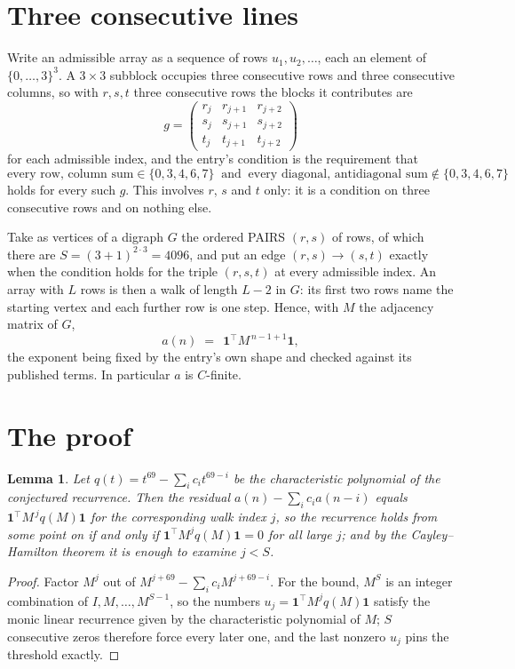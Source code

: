 \documentclass[11pt,a4paper]{article}
\theoremstyle{plain}
\newtheorem{lemma}[theorem]{Lemma}
\theoremstyle{definition}
\begin{document}
\section{Three consecutive lines}

Write an admissible array as a sequence of rows $u_1,u_2,\dots$, each an element of
$\{0,\dots,3\}^{3}$. A $3\times3$ subblock occupies three consecutive rows and
three consecutive columns, so with $r,s,t$ three consecutive rows the blocks it
contributes are
\[
g=\begin{pmatrix}r_j&r_{j+1}&r_{j+2}\\ s_j&s_{j+1}&s_{j+2}\\ t_j&t_{j+1}&t_{j+2}\end{pmatrix}
\]
for each admissible index, and the entry's condition is the requirement that
\[
\text{every row, column sum} \in \{0,3,4,6,7\}\ \text{ and }\ \text{every diagonal, antidiagonal sum} \notin \{0,3,4,6,7\}
\]
holds for every such $g$. This involves $r$, $s$ and $t$ only: it is a condition on
three consecutive rows and on nothing else.

Take as vertices of a digraph $G$ the ordered PAIRS $(r,s)$ of rows, of which there are
$S=(3+1)^{2\cdot3}=4096$, and put an edge $(r,s)\to(s,t)$ exactly when the condition
holds for the triple $(r,s,t)$ at every admissible index. An array with $L$ rows is then a
walk of length $L-2$ in $G$: its first two rows name the starting vertex and each further
row is one step. Hence, with $M$ the adjacency matrix of $G$,
\[
a(n)\;=\;\,\mathbf{1}^{\!\top}M^{\,n-1+1}\mathbf{1},
\]
the exponent being fixed by the entry's own shape and checked against its published terms.
In particular $a$ is $C$-finite.

\section{The proof}

\begin{lemma}\label{lem:crit}
Let $q(t)=t^{69}-\sum_i c_it^{69-i}$ be the characteristic polynomial of the
conjectured recurrence. Then the residual $a(n)-\sum_ic_ia(n-i)$ equals
$\mathbf{1}^{\!\top}M^{\,j}q(M)\mathbf{1}$ for the corresponding walk index
$j$, so the recurrence holds from some point on if and only if
$\mathbf{1}^{\!\top}M^{j}q(M)\mathbf{1}=0$ for all large $j$; and by the
Cayley--Hamilton theorem it is enough to examine $j<S$.
\end{lemma}

\begin{proof}
Factor $M^{j}$ out of $M^{j+69}-\sum_ic_iM^{j+69-i}$. For the bound, $M^{S}$
is an integer combination of $I,M,\dots,M^{S-1}$, so the numbers
$u_j=\mathbf{1}^{\!\top}M^{j}q(M)\mathbf{1}$ satisfy the monic linear recurrence given by
the characteristic polynomial of $M$; $S$ consecutive zeros therefore force every later one,
and the last nonzero $u_j$ pins the threshold exactly.
\end{proof}
\end{document}

